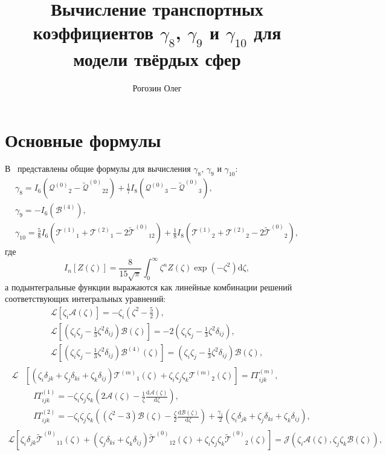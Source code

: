\documentclass[a4paper,12pt]{article}
\title{Вычисление транспортных коэффициентов \(\gamma_8\), \(\gamma_9\) и \(\gamma_{10}\) для модели твёрдых сфер}
\author{Рогозин Олег}
\newcommand{\dd}{\mathrm{d}}
\newcommand{\der}[2][]{\frac{\dd#1}{\dd#2}}
\newcommand{\B}{\ensuremath{\mathcal{B}^{(4)}}}
\newcommand{\Q}{\ensuremath{\mathcal{Q}^{(0)}}}
\newcommand{\T}[1]{\ensuremath{\mathcal{T}^{(#1)}}}
\newcommand{\TT}{\ensuremath{\tilde{\mathcal{T}}^{(0)}}}
\newcommand{\QQ}{\ensuremath{\tilde{\mathcal{Q}}^{(0)}}}
\newcommand{\ZD}[2]{\zeta_{#1}\delta_{#2}}
\newcommand{\ZZZ}{\zeta_i\zeta_j\zeta_k}
\begin{document}
\maketitle
\tableofcontents

\section{Основные формулы}

В~\cite{Sone2000, Sone2002} представлены общие формулы для вычисления \(\gamma_8\), \(\gamma_9\) и \(\gamma_{10}\):
\begin{gather}
    \gamma_8 = I_6\left(\Q_2 - \QQ_{22}\right) + \frac17 I_8\left(\Q_3 - \QQ_3\right), \label{eq:gamma_8}\\
    \gamma_9 = -I_6\left(\B\right), \label{eq:gamma_9}\\
    \gamma_{10} = \frac58 I_6\left(\T{1}_1 + \T{2}_1 - 2\TT_{12}\right)
        + \frac18 I_8\left(\T{1}_2 + \T{2}_2 - 2\TT_2\right), \label{eq:gamma_10}
\end{gather}
где
\begin{equation}\label{eq:I_n}
    I_n[Z(\zeta)] = \frac{8}{15\sqrt\pi} \int_0^\infty \zeta^n Z(\zeta) \exp(-\zeta^2) \dd\zeta,
\end{equation}
а подынтегральные функции выражаются как линейные комбинации решений соответствующих интегральных уравнений:
\begin{gather}
    \mathcal{L}\left[\zeta_i\mathcal{A}(\zeta)\right] = -\zeta_i\left(\zeta^2-\frac52\right), \label{eq:A}\\[6pt]
    \mathcal{L}\left[\left(\zeta_i\zeta_j-\frac13\zeta^2\delta_{ij}\right)\mathcal{B}(\zeta)\right] =
        -2\left(\zeta_i\zeta_j-\frac13\zeta^2\delta_{ij}\right), \label{eq:B}\\[6pt]
    \mathcal{L}\left[\left(\zeta_i\zeta_j-\frac13\zeta^2\delta_{ij}\right)\B(\zeta)\right] =
        \left(\zeta_i\zeta_j-\frac13\zeta^2\delta_{ij}\right)\mathcal{B}(\zeta), \label{eq:B_4}
\end{gather}
\begin{gather}
    \begin{aligned}
    \mathcal{L}&\left[(\ZD{i}{jk}+\ZD{j}{ki}+\ZD{k}{ij})\T{m}_1(\zeta) + \ZZZ\T{m}_2(\zeta)\right] = IT^{(m)}_{ijk}, \\
        &\quad IT^{(1)}_{ijk} = -\ZZZ\left( 2\mathcal{A}(\zeta) - \frac1\zeta \der[\mathcal{A}(\zeta)]{\zeta} \right), \\
        &\quad IT^{(2)}_{ijk} = -\ZZZ\left( (\zeta^2-3)\mathcal{B}(\zeta) - \frac\zeta2 \der[\mathcal{B}(\zeta)]{\zeta} \right)
        + \frac{\gamma_1}{2} (\ZD{i}{jk}+\ZD{j}{ki}+\ZD{k}{ij}),
    \end{aligned}\label{eq:T}\\
    \mathcal{L}\left[\ZD{i}{jk}\TT_{11}(\zeta)+(\ZD{j}{ki}+\ZD{k}{ij})\TT_{12}(\zeta) + \ZZZ\TT_2(\zeta)\right]
        = \mathcal{J}(\zeta_i\mathcal{A}(\zeta), \zeta_j\zeta_k\mathcal{B}(\zeta)), \label{eq:TT}
\end{gather}
\end{document}
